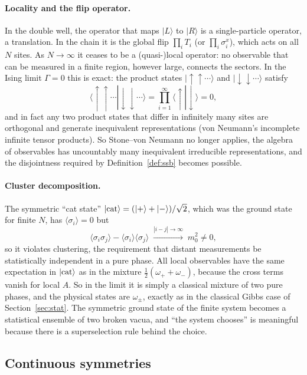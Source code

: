 \documentclass[11pt,a4paper]{article}
\theoremstyle{definition}
\theoremstyle{remark}
\newcommand{\ket}[1]{|#1\rangle}
\newcommand{\braket}[2]{\langle #1|#2\rangle}
\newcommand{\ev}[1]{\langle #1\rangle}
\begin{document}
\paragraph{Locality and the flip operator.} In the double well, the operator that maps $\ket L$ to $\ket R$ is
a single-particle operator, a translation. In the chain it is the global flip $\prod_iT_i$ (or
$\prod_i\sigma^x_i$), which acts on all $N$ sites. As $N\to\infty$ it ceases to be a (quasi-)local operator: no
observable that can be measured in a finite region, however large, connects the sectors. In the Ising limit
$\Gamma=0$ this is exact: the product states $\ket{\uparrow\uparrow\cdots}$ and $\ket{\downarrow\downarrow\cdots}$
satisfy
\begin{equation}
\braket{\uparrow\uparrow\cdots}{\downarrow\downarrow\cdots}=\prod_{i=1}^{\infty}\braket{\uparrow}{\downarrow}=0,
\end{equation}
and in fact any two product states that differ in infinitely many sites are orthogonal and generate
inequivalent representations (von Neumann's incomplete infinite tensor products). So Stone--von Neumann no
longer applies, the algebra of observables has uncountably many inequivalent irreducible representations,
and the disjointness required by Definition~\ref{def:ssb} becomes possible.

\paragraph{Cluster decomposition.} The symmetric ``cat state'' $\ket{\rm cat}=(\ket++\ket-)/\sqrt2$, which was
the ground state for finite $N$, has $\ev{\sigma_i}=0$ but
\begin{equation}
\ev{\sigma_i\sigma_j}-\ev{\sigma_i}\ev{\sigma_j}\;\xrightarrow{|i-j|\to\infty}\;m_0^2\neq0,
\end{equation}
so it violates clustering, the requirement that distant measurements be statistically independent in a pure
phase. All local observables have the same expectation in $\ket{\rm cat}$ as in the mixture
$\tfrac12(\omega_++\omega_-)$, because the cross terms vanish for local $A$. So in the limit it is simply a
classical mixture of two pure phases, and the physical states are $\omega_\pm$, exactly as in the classical
Gibbs case of Section~\ref{sec:stat}. The symmetric ground state of the finite system becomes a statistical
ensemble of two broken vacua, and ``the system chooses'' is meaningful because there is a superselection rule
behind the choice.

\subsection{Continuous symmetries}
\end{document}
